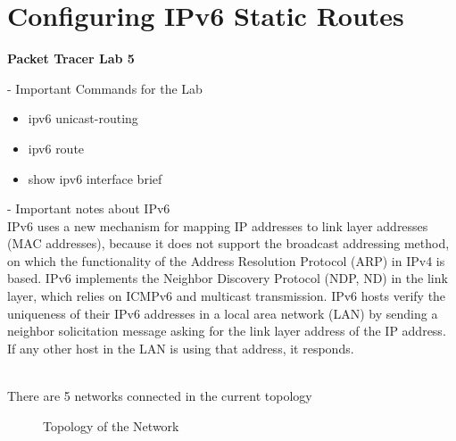\documentclass[../EngineeringJournal_CDavis.tex]{subfiles}
\begin{document}

\chapter[Configuring IPv6 Static Routes]{Configuring IPv6 \linebreak[1] Static Routes \hspace*{\fill}{Feb 6, 2020}}
\noindent\textbf{{Packet Tracer Lab 5} }                             

\hspace{0.2cm}
\begin{tcolorbox}[width=6.3in]
\scriptsize 
- Important Commands for the Lab
  \begin{itemize}
    \item{ipv6 unicast-routing}
    \item{ipv6 route} 
    \item{show ipv6 interface brief} 
  \end{itemize}
\normalsize
- Important notes about IPv6
\scriptsize
\\IPv6 uses a new mechanism for mapping IP addresses to link layer addresses 
(MAC addresses), because it does not support the broadcast addressing method, 
on which the functionality of the Address Resolution Protocol (ARP) in IPv4 is based. 
IPv6 implements the Neighbor Discovery Protocol (NDP, ND) in the link layer, 
which relies on ICMPv6 and multicast transmission. IPv6 hosts verify the 
uniqueness of their IPv6 addresses in a local area network (LAN) 
by sending a neighbor solicitation message asking for the link layer 
address of the IP address. If any other host in the LAN is 
using that address, it responds.
\normalsize
\end{tcolorbox}
\hspace{0.2cm}

\newpage

\\
There are 5 networks connected in the current topology

\begin{figure}[!hbt]
  \centering
  \caption{Topology of the Network}\label{Top5}
\end{figure}
\end{document}
